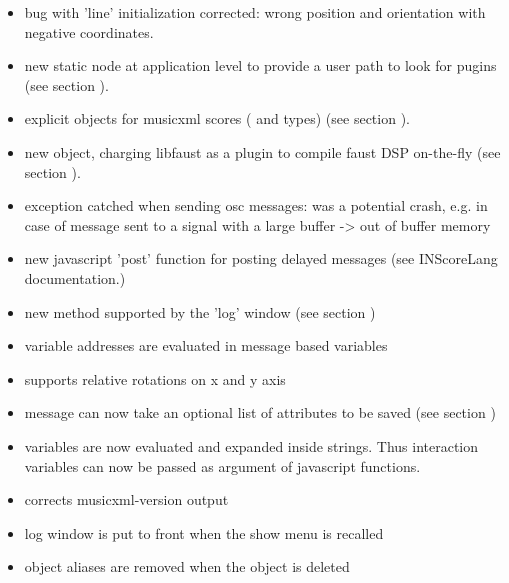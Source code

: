 \begin{itemize}
\item bug with 'line' initialization corrected: wrong position and orientation with negative coordinates.
\item new  static node at application level to provide a user path to look for pugins (see section ).
\item explicit objects for musicxml scores ( and  types) (see section ).
\item new  object, charging libfaust as a plugin to compile faust DSP on-the-fly (see section ).
\item exception catched when sending osc messages: was a potential crash, 
  e.g. in case of  message sent to a signal with a large buffer -> out of buffer memory
\item new javascript 'post' function for posting delayed messages  (see INScoreLang documentation.)
\item new  method supported by the 'log' window (see section )
\item variable addresses are evaluated in message based variables
\item supports relative rotations on x and y axis
\end{itemize}

\begin{itemize}
\item {} message can now take an optional list of attributes to be saved  (see section )
\item variables are now evaluated and expanded inside strings. Thus interaction variables can now be passed as argument of javascript functions.
\item corrects musicxml-version output
\item log window is put to front when the show menu is recalled
\item object aliases are removed when the object is deleted
\end{itemize}

